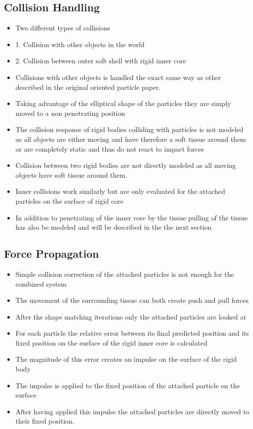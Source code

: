 \subsection{Collision Handling}
\label{subsec:collision_handling}

\begin{itemize}
\item Two different types of collisions
\item 1. Collision with other objects in the world
\item 2. Collision between outer soft shell with rigid inner core
\item Collisions with other objects is handled the exact same way as other described in the original oriented particle paper.
\item Taking advantage of the elliptical shape of the particles they are simply moved to a non penetrating position
\item The collision response of rigid bodies colliding with particles is not modeled as all objects are either moving and have therefore a soft tissue around them or are completely static and thus do not react to impact forces
\item Collision between two rigid bodies are not directly modeled as all moving objects have soft tissue around them.
\item Inner collisions work similarly but are only evaluated for the attached particles on the surface of rigid core
\item In addition to penetrating of the inner core by the tissue pulling of the tissue has also be modeled and will be described in the the next section
\end{itemize}

\subsection{Force Propagation}
\label{subsec:force_propagation}

\begin{itemize}
\item Simple collision correction of the attached particles is not enough for the combined system
\item The movement of the surrounding tissue can both create push and pull forces
\item After the shape matching iterations only the attached particles are looked at
\item For each particle the relative error between its final predicted position and its fixed position on the surface of the rigid inner core is calculated
\item The magnitude of this error creates an impulse on the surface of the rigid body
\item The impulse is applied to the fixed position of the attached particle on the surface
\item After having applied this impulse the attached particles are directly moved to their fixed position.
\end{itemize}

